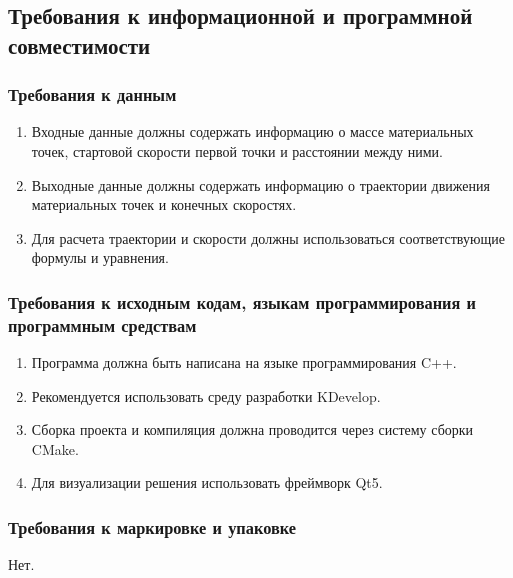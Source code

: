  \subsection{Требования к информационной и программной совместимости}
 \subsubsection{Требования к данным}
 \begin{enumerate}
  \item Входные данные должны содержать информацию о массе материальных точек, стартовой скорости первой точки и расстоянии между ними.
  \item Выходные данные должны содержать информацию о траектории движения материальных точек и конечных скоростях.
  \item Для расчета траектории и скорости должны использоваться соответствующие формулы и уравнения.
 \end{enumerate}

 \subsubsection{ Требования к исходным кодам, языкам программирования и программным средствам}
 \begin{enumerate}
  \item Программа должна быть написана на языке программирования C++.
  \item Рекомендуется использовать среду разработки KDevelop.
  \item Сборка проекта и компиляция должна проводится через систему сборки CMake.
  \item Для визуализации решения использовать фреймворк Qt5.
 \end{enumerate}

 \subsubsection{Требования к маркировке и упаковке}
 Нет.

